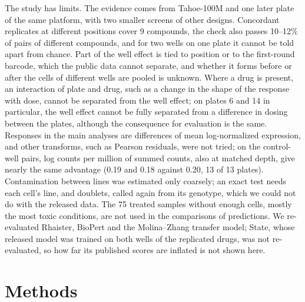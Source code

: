 \documentclass[pdflatex,sn-nature]{sn-jnl}
\begin{document}
The study has limits. The evidence comes from Tahoe-100M and one later plate of the same platform, with two smaller screens of other designs. Concordant replicates at different positions cover 9 compounds, the check also passes 10--12\% of pairs of different compounds, and for two wells on one plate it cannot be told apart from chance. Part of the well effect is tied to position or to the first-round barcode, which the public data cannot separate, and whether it forms before or after the cells of different wells are pooled is unknown. Where a drug is present, an interaction of plate and drug, such as a change in the shape of the response with dose, cannot be separated from the well effect; on plates 6 and 14 in particular, the well effect cannot be fully separated from a difference in dosing between the plates, although the consequence for evaluation is the same. Responses in the main analyses are differences of mean log-normalized expression, and other transforms, such as Pearson residuals, were not tried; on the control-well pairs, log counts per million of summed counts, also at matched depth, give nearly the same advantage (0.19 and 0.18 against 0.20, 13 of 13 plates). Contamination between lines was estimated only coarsely; an exact test needs each cell's line, and doublets, called again from its genotype, which we could not do with the released data. The 75 treated samples without enough cells, mostly the most toxic conditions, are not used in the comparisons of predictions. We re-evaluated Rhaister, BioPert and the Molina--Zhang transfer model; State, whose released model was trained on both wells of the replicated drugs, was not re-evaluated, so how far its published scores are inflated is not shown here.

\section{Methods}
\end{document}
